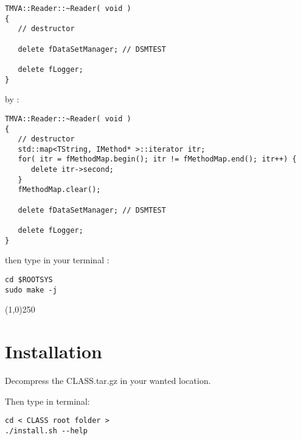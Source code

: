 \begin{center}
\begin{minipage}{\textwidth}
\begin{lstlisting}[style=customc]
TMVA::Reader::~Reader( void )
{
   // destructor

   delete fDataSetManager; // DSMTEST

   delete fLogger;
}
\end{lstlisting}
\end{minipage}
\end{center}

by :\\
\begin{center}
\begin{minipage}{\textwidth}
\begin{lstlisting}[style=customc]
TMVA::Reader::~Reader( void )
{
   // destructor
   std::map<TString, IMethod* >::iterator itr;
   for( itr = fMethodMap.begin(); itr != fMethodMap.end(); itr++) {
      delete itr->second;
   }
   fMethodMap.clear();

   delete fDataSetManager; // DSMTEST

   delete fLogger;
}
\end{lstlisting}
\end{minipage}
\end{center}

then type in your terminal : 

\begin{center}
\begin{minipage}{\textwidth}
\begin{lstlisting}[style=terminal]
cd $ROOTSYS
sudo make -j
\end{lstlisting}
\end{minipage}
\end{center}

\begin{center}
\line(1,0){250}
\end{center}


\section{Installation}
Decompress the CLASS.tar.gz in your wanted location. 

 Then type in terminal:
\begin{center}
\begin{minipage}{\textwidth}
\begin{lstlisting}[style=terminal]
cd < CLASS root folder >
./install.sh --help
\end{lstlisting}
\end{minipage}
\end{center}

